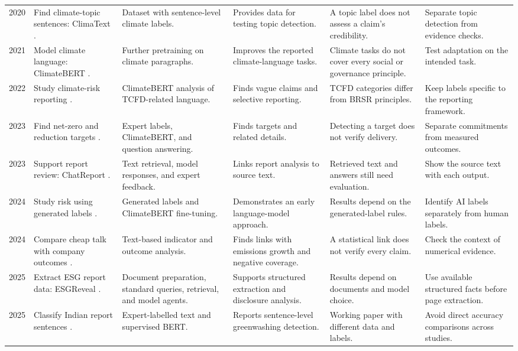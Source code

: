 {\begin{longtable}{@{}L{0.85cm}L{2.35cm}L{2.65cm}L{2.65cm}L{2.65cm}L{2.65cm}@{}}
2020 & Find climate-topic sentences: ClimaText \cite{varini2020}. & Dataset with sentence-level climate labels. & Provides data for testing topic detection. & A topic label does not assess a claim's credibility. & Separate topic detection from evidence checks.\\
2021 & Model climate language: ClimateBERT \cite{webersinke2021}. & Further pretraining on climate paragraphs. & Improves the reported climate-language tasks. & Climate tasks do not cover every social or governance principle. & Test adaptation on the intended task.\\
2022 & Study climate-risk reporting \cite{bingler2022}. & ClimateBERT analysis of TCFD-related language. & Finds vague claims and selective reporting. & TCFD categories differ from BRSR principles. & Keep labels specific to the reporting framework.\\
2023 & Find net-zero and reduction targets \cite{schimanski2023}. & Expert labels, ClimateBERT, and question answering. & Finds targets and related details. & Detecting a target does not verify delivery. & Separate commitments from measured outcomes.\\
2023 & Support report review: ChatReport \cite{ni2023}. & Text retrieval, model responses, and expert feedback. & Links report analysis to source text. & Retrieved text and answers still need evaluation. & Show the source text with each output.\\
2024 & Study risk using generated labels \cite{vinella2024}. & Generated labels and ClimateBERT fine-tuning. & Demonstrates an early language-model approach. & Results depend on the generated-label rules. & Identify AI labels separately from human labels.\\
2024 & Compare cheap talk with company outcomes \cite{bingler2024}. & Text-based indicator and outcome analysis. & Finds links with emissions growth and negative coverage. & A statistical link does not verify every claim. & Check the context of numerical evidence.\\
2025 & Extract ESG report data: ESGReveal \cite{zou2025}. & Document preparation, standard queries, retrieval, and model agents. & Supports structured extraction and disclosure analysis. & Results depend on documents and model choice. & Use available structured facts before page extraction.\\
2025 & Classify Indian report sentences \cite{shankar2025}. & Expert-labelled text and supervised BERT. & Reports sentence-level greenwashing detection. & Working paper with different data and labels. & Avoid direct accuracy comparisons across studies.\\

\end{longtable}}
